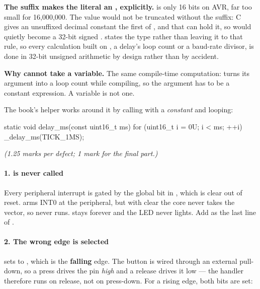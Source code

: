 \textbf{The  suffix makes the literal an , explicitly.}  is
only 16 bits on AVR, far too small for 16,000,000. The value would not be truncated without the
suffix: C gives an unsuffixed decimal constant the first of ,  and
 that can hold it, so  would quietly become a 32-bit signed
.  states the type rather than leaving it to that rule, so every calculation
built on , a delay's loop count or a baud-rate divisor, is done in 32-bit unsigned
arithmetic by design rather than by accident. 

\textbf{Why  cannot take a variable.} The same compile-time computation:
 turns its argument into a loop count while compiling, so the argument has to be
a constant expression. A  variable is not one.

The book's helper works around it by calling  with a \emph{constant} and looping:

\begin{ccode}
static void delay_ms(const uint16_t ms)
{
    for (uint16_t i = 0U; i < ms; ++i)
    {
        _delay_ms(TICK_1MS);
    }
}
\end{ccode}


\textit{(1.25 marks per defect; 1 mark for the final part.)}

\paragraph{1.  is never called}
Every peripheral interrupt is gated by the global  bit in , which is clear out of
reset.  arms INT0 at the peripheral, but with  clear the core never takes the
vector, so  never runs.  stays  forever and the
LED never lights. Add  as the last line of .

\paragraph{2. The wrong edge is selected}
 sets  to , which is the \textbf{falling}
edge. The button is wired through an external pull-down, so a press drives the pin \emph{high} and
a release drives it low --- the handler therefore runs on release, not on press-down. For a rising
edge, both bits are set:

